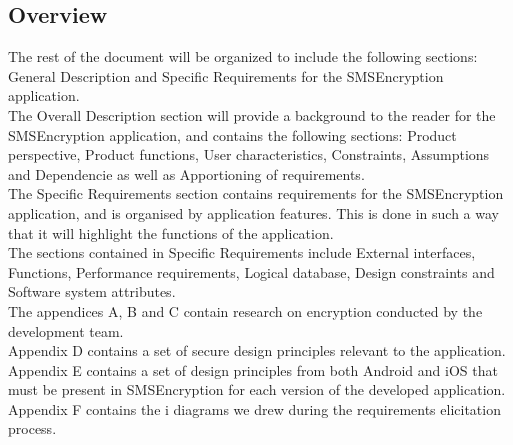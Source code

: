 \subsection{Overview}
The rest of the document will be organized to include the following sections: General Description and Specific Requirements for the SMSEncryption application.
\vspace{10pt}\\
The Overall Description section will provide a background to the reader for the SMSEncryption application, and contains the following sections: Product perspective, Product functions, User characteristics, Constraints,  Assumptions and Dependencie as well as Apportioning of requirements.
\vspace{10pt}\\
The Specific Requirements section contains requirements for the SMSEncryption application, and is organised by application features. This is done in such a way that it will highlight the functions of the application. 
\vspace{10pt}\\
The sections contained in Specific Requirements include External interfaces, Functions, Performance requirements, Logical database, Design constraints and Software system attributes.
\vspace{10pt}\\
The appendices A, B and C contain research on encryption conducted by the development team.
\vspace{10pt}\\
Appendix D contains a set of secure design principles relevant to the application.
\vspace{10pt}\\
Appendix E contains a set of design principles from both Android and iOS that must be present in SMSEncryption for each version of the developed application.
\vspace{10pt}\\
Appendix F contains the i\text{*} diagrams we drew during the requirements elicitation process.